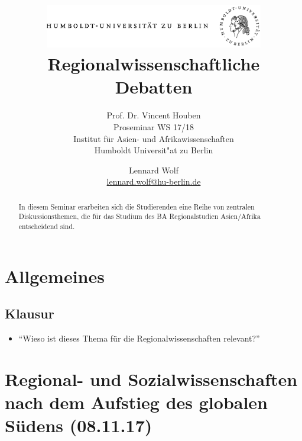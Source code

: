 \documentclass[emulatestandardclasses]{scrartcl}
\date{\vspace{-3ex}}
\begin{document}
\title{
	\includegraphics*[bb=0 0 720 200, width=0.72\textwidth]{ErstesSem/images/hu_logo.png}\\
	\vspace{25pt}
	Regionalwissenschaftliche\\Debatten}
\subtitle{\vspace{10pt}
			Prof. Dr. Vincent Houben\\
			Proseminar WS 17/18\\
          Institut für Asien- und Afrikawissenschaften\\ 
          Humboldt Universit"at zu Berlin}
\author{Lennard Wolf\\
        \small{\href{mailto:lennard.wolf@hu-berlin.de}{lennard.wolf@hu-berlin.de}}}
\maketitle
\begin{abstract}
In diesem Seminar erarbeiten sich die Studierenden eine Reihe von zentralen Diskussionsthemen, die für das Studium des BA Regionalstudien Asien/Afrika entscheidend sind.

\end{abstract}
\newpage

\newpage

\section{Allgemeines}

\subsection{Klausur}

\begin{itemize}
  \item "`Wieso ist dieses Thema für die Regionalwissenschaften relevant?"'
\end{itemize}


\section{Regional- und Sozialwissenschaften nach dem Aufstieg des globalen Südens (08.11.17)}
\end{document}
